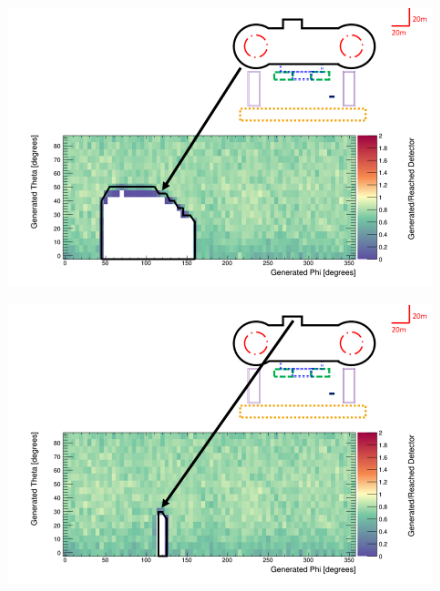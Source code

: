 \begin{figure}
 \centering
 \includegraphics[width=\linewidth]{Chapter5/Figs/wylfaRasterNew/dogBoneGen_Reached.png}
 \label{fig:dogBoneGen_Reached}
\end{figure}

\begin{figure}
 \centering
 \includegraphics[width=\linewidth]{Chapter5/Figs/wylfaRasterNew/backServiceGen_Reached.png}
 \label{fig:backServiceGen_Reached}
\end{figure}

